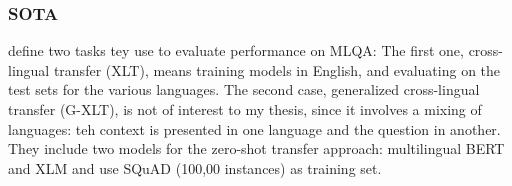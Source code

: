 






\subsubsection{SOTA}
\label{chap:mlqa-sota}

\citeauthor{lewis2019mlqa} define two tasks tey use to evaluate performance on MLQA: The first
one, cross-lingual transfer (XLT), means training models in English, and evaluating on the test
sets for the various languages. The second case, generalized cross-lingual transfer (G-XLT), is
not of interest to my thesis, since it involves a mixing of languages: teh context is presented
in one language and the question in another. They include two models for the zero-shot transfer
approach: multilingual BERT and XLM and use SQuAD (100,00 instances) as training set.

